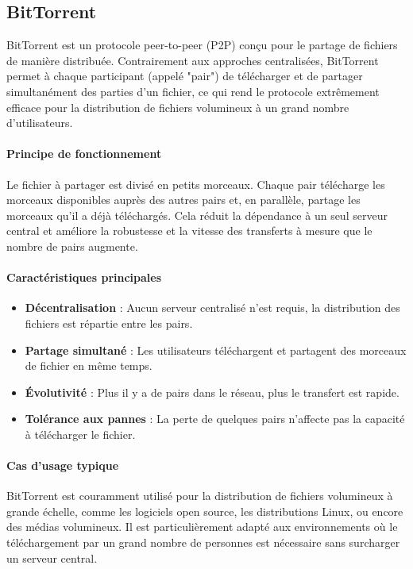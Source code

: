\subsection{BitTorrent}
BitTorrent est un protocole peer-to-peer (P2P) conçu pour le partage de fichiers de manière distribuée\cite{wikipedia-contributors-2024-bitorrent, wiki-bitorrent}. Contrairement aux approches centralisées, BitTorrent permet à chaque participant (appelé "pair") de télécharger et de partager simultanément des parties d'un fichier, ce qui rend le protocole extrêmement efficace pour la distribution de fichiers volumineux à un grand nombre d'utilisateurs.

\paragraph{Principe de fonctionnement\cite{wikipedia-contributors-2024-bitorrent}}
Le fichier à partager est divisé en petits morceaux. Chaque pair télécharge les morceaux disponibles auprès des autres pairs et, en parallèle, partage les morceaux qu'il a déjà téléchargés. Cela réduit la dépendance à un seul serveur central et améliore la robustesse et la vitesse des transferts à mesure que le nombre de pairs augmente.

\paragraph{Caractéristiques principales} \begin{itemize} \item \textbf{Décentralisation} : Aucun serveur centralisé n'est requis, la distribution des fichiers est répartie entre les pairs. \item \textbf{Partage simultané} : Les utilisateurs téléchargent et partagent des morceaux de fichier en même temps. \item \textbf{Évolutivité} : Plus il y a de pairs dans le réseau, plus le transfert est rapide. \item \textbf{Tolérance aux pannes} : La perte de quelques pairs n'affecte pas la capacité à télécharger le fichier. \end{itemize}

\paragraph{Cas d'usage typique}
BitTorrent est couramment utilisé pour la distribution de fichiers volumineux à grande échelle, comme les logiciels open source, les distributions Linux, ou encore des médias volumineux. Il est particulièrement adapté aux environnements où le téléchargement par un grand nombre de personnes est nécessaire sans surcharger un serveur central.

